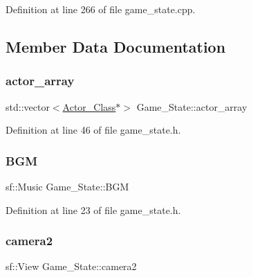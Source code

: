 Definition at line 266 of file game\+\_\+state.\+cpp.



\subsection{Member Data Documentation}
\hypertarget{class_game___state_a5b5ad0c10282bbb7e407ccbba8a7c213}{}\label{class_game___state_a5b5ad0c10282bbb7e407ccbba8a7c213} 
\subsubsection{\texorpdfstring{actor\+\_\+array}{actor\_array}}
{\footnotesize\ttfamily std\+::vector$<$\hyperlink{class_actor___class}{Actor\+\_\+\+Class}$\ast$$>$ Game\+\_\+\+State\+::actor\+\_\+array\hspace{0.3cm}{\ttfamily [protected]}}



Definition at line 46 of file game\+\_\+state.\+h.

\hypertarget{class_game___state_a3e529295cb321b91f68594e06ee5f8de}{}\label{class_game___state_a3e529295cb321b91f68594e06ee5f8de} 
\subsubsection{\texorpdfstring{B\+GM}{BGM}}
{\footnotesize\ttfamily sf\+::\+Music Game\+\_\+\+State\+::\+B\+GM}



Definition at line 23 of file game\+\_\+state.\+h.

\hypertarget{class_game___state_a041c421a58505094d2dfc07f8a055e45}{}\label{class_game___state_a041c421a58505094d2dfc07f8a055e45} 
\subsubsection{\texorpdfstring{camera2}{camera2}}
{\footnotesize\ttfamily sf\+::\+View Game\+\_\+\+State\+::camera2\hspace{0.3cm}{\ttfamily [protected]}}



